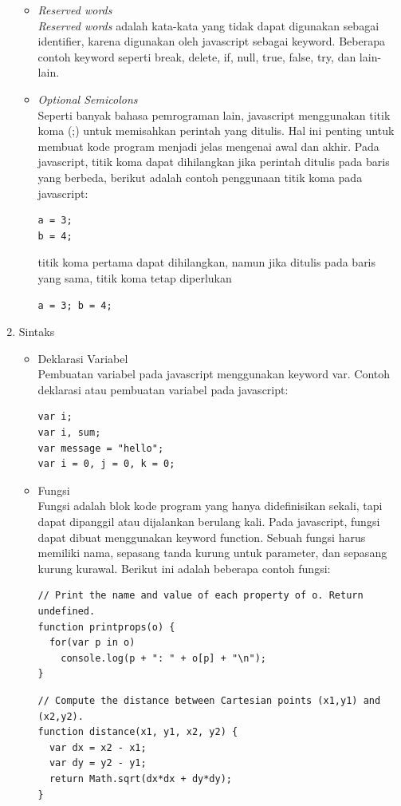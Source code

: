 \begin{enumerate}
\begin{itemize}
\item \textit{Reserved words} \\
\textit{Reserved words} adalah kata-kata yang tidak dapat digunakan sebagai
identifier, karena digunakan oleh javascript sebagai keyword. Beberapa contoh keyword seperti break, delete, if, 
null, true, false, try, dan lain-lain.

\item \textit{Optional Semicolons} \\
Seperti banyak bahasa pemrograman lain, javascript menggunakan titik koma (;) untuk memisahkan perintah 
yang ditulis. Hal ini penting untuk membuat kode program menjadi jelas mengenai awal dan akhir. Pada 
javascript, titik koma dapat dihilangkan jika perintah ditulis pada baris yang berbeda, berikut adalah 
contoh penggunaan titik koma pada javascript:
\begin{verbatim}
a = 3;
b = 4;
\end{verbatim}
titik koma pertama dapat dihilangkan, namun jika ditulis pada baris yang sama, titik koma tetap diperlukan
\begin{verbatim}
a = 3; b = 4;
\end{verbatim}
\end{itemize}

\item Sintaks
\begin{itemize}
\item Deklarasi Variabel \\
Pembuatan variabel pada javascript menggunakan keyword var. Contoh deklarasi atau pembuatan variabel pada javascript:
\begin{verbatim}
var i;
var i, sum;
var message = "hello";
var i = 0, j = 0, k = 0;
\end{verbatim}


\item Fungsi \\
Fungsi adalah blok kode program yang hanya didefinisikan sekali, tapi dapat
dipanggil atau dijalankan berulang kali. Pada javascript, fungsi dapat dibuat menggunakan keyword function. 
Sebuah fungsi harus memiliki nama, sepasang tanda kurung untuk parameter, dan sepasang kurung kurawal. 
Berikut ini adalah beberapa contoh fungsi:
\begin{verbatim}
// Print the name and value of each property of o. Return undefined.
function printprops(o) {
  for(var p in o)
    console.log(p + ": " + o[p] + "\n");
}
\end{verbatim}
\begin{verbatim}
// Compute the distance between Cartesian points (x1,y1) and (x2,y2).
function distance(x1, y1, x2, y2) {
  var dx = x2 - x1;
  var dy = y2 - y1;
  return Math.sqrt(dx*dx + dy*dy);
}
\end{verbatim}
\end{itemize}
\end{enumerate}

